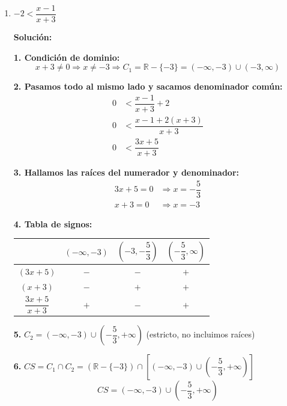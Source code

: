 \documentclass[12pt]{article}
\newcommand{\solucion}{%
    \vspace{0.8em}%
    \textbf{Solución:}%
}
\begin{document}
\begin{enumerate}[label=\alph*.-]
\begin{center}
    \end{center}

    \newpage
    \item $-2 < \dfrac{x-1}{x+3}$

    \solucion

    \textbf{1. Condición de dominio:}
    \[
    x + 3 \neq 0 \Rightarrow x \neq -3 \Rightarrow C_1 = \mathbb{R} - \{-3\} = (-\infty, -3) \cup (-3, \infty)
    \]

    \textbf{2. Pasamos todo al mismo lado y sacamos denominador común:}
    \begin{align*}
    0 &< \dfrac{x-1}{x+3} + 2 \\[0.3em]
    0 &< \dfrac{x - 1 + 2(x+3)}{x+3} \\[0.3em]
    0 &< \dfrac{3x + 5}{x+3}
    \end{align*}

    \textbf{3. Hallamos las raíces del numerador y denominador:}
    \begin{align*}
    3x + 5 = 0 &\Rightarrow x = -\dfrac{5}{3} \\
    x + 3 = 0 &\Rightarrow x = -3
    \end{align*}

    \textbf{4. Tabla de signos:}

    \begin{center}
    \begin{tabular}{|c|c|c|c|}
    \hline
    & $(-\infty, -3)$ & $\left(-3, -\dfrac{5}{3}\right)$ & $\left(-\dfrac{5}{3}, \infty\right)$ \\
    \hline
    $(3x+5)$ & $-$ & $-$ & $+$ \\
    \hline
    $(x+3)$ & $-$ & $+$ & $+$ \\
    \hline
    $\dfrac{3x+5}{x+3}$ & $+$ & $-$ & $+$ \\
    \hline
    \end{tabular}
    \end{center}

    \textbf{5.} $C_2 = (-\infty, -3) \cup \left(-\dfrac{5}{3}, +\infty\right)$ \quad (estricto, no incluimos raíces)

    \textbf{6.} $CS = C_1 \cap C_2 = \left(\mathbb{R} - \{-3\}\right) \cap \left[(-\infty, -3) \cup \left(-\dfrac{5}{3}, +\infty\right)\right]$
    \[
    \boxed{CS = (-\infty, -3) \cup \left(-\dfrac{5}{3}, +\infty\right)}
    \]


\end{enumerate}
\end{document}
